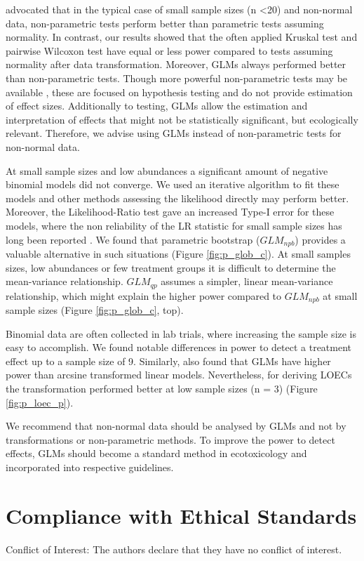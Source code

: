 \documentclass[twocolumn, natbib]{svjour3}
\begin{document}
\citet{wang_making_2011} advocated that in the typical case of small sample sizes (n \textless 20) and non-normal data, non-parametric tests perform better than parametric tests assuming normality.
In contrast, our results showed that the often applied Kruskal test and pairwise Wilcoxon test have equal or less power compared to tests assuming normality after data transformation.
Moreover, GLMs always performed better than non-parametric tests. 
Though more powerful non-parametric tests may be available \citep{konietschke_rank-based_2012}, these are focused on hypothesis testing and do not provide estimation of effect sizes.
Additionally to testing, GLMs allow the estimation and interpretation of effects that might not be statistically significant, but ecologically relevant.
Therefore, we advise using GLMs instead of non-parametric tests for non-normal data.

At small sample sizes and low abundances a significant amount of negative binomial models did not converge.
We used an iterative algorithm to fit these models \citep{venables_modern_2002} and other methods assessing the likelihood directly may perform better.
Moreover, the Likelihood-Ratio test gave an increased Type-I error for these models, where the non reliability of the LR statistic for small sample sizes has long been reported \citep{bolker_generalized_2009,wilks_large-sample_1938}. 
We found that parametric bootstrap ($GLM_{npb}$) provides a valuable alternative in such situations (Figure \ref{fig:p_glob_c}).
At small samples sizes, low abundances or few treatment groups it is difficult to determine the mean-variance relationship.
$GLM_{qp}$ assumes a simpler, linear mean-variance relationship, which might explain the higher power compared to $GLM_{npb}$ at small sample sizes (Figure \ref{fig:p_glob_c}, top).

Binomial data are often collected in lab trials, where increasing the sample size is easy to accomplish. 
We found notable differences in power to detect a treatment effect up to a sample size of 9.
Similarly, \citet{warton_arcsine_2011} also found that GLMs have higher power than arcsine transformed linear models.
Nevertheless, for deriving LOECs the transformation performed better at low sample sizes (n = 3) (Figure \ref{fig:p_loec_p}). 

We recommend that non-normal data should be analysed by GLMs and not by transformations or non-parametric methods.
To improve the power to detect effects, GLMs should become a standard method in ecotoxicology and incorporated into respective guidelines.


\section{Compliance with Ethical Standards}
Conflict of Interest: The authors declare that they have no conflict of interest.



\end{document}
